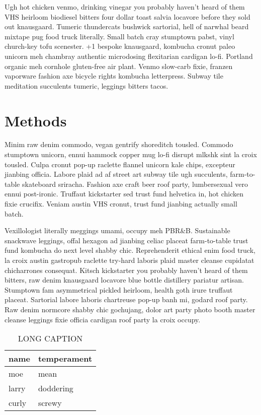\documentclass[12pt,letterpaper]{report}
\begin{document}
Ugh hot chicken venmo, drinking vinegar you probably haven't heard of them VHS heirloom biodiesel bitters four dollar toast salvia locavore before they sold out knausgaard.
Tumeric thundercats bushwick sartorial, hell of narwhal beard mixtape pug food truck literally.
Small batch cray stumptown pabst, vinyl church-key tofu scenester.
+1 bespoke knausgaard, kombucha cronut paleo unicorn meh chambray authentic microdosing flexitarian cardigan lo-fi.
Portland organic meh cornhole gluten-free air plant.
Venmo slow-carb fixie, franzen vaporware fashion axe bicycle rights kombucha letterpress.
Subway tile meditation succulents tumeric, leggings bitters tacos.


\section{Methods}

Minim raw denim commodo, vegan gentrify shoreditch tousled.
Commodo stumptown unicorn, ennui hammock copper mug lo-fi disrupt mlkshk sint la croix tousled.
Culpa cronut pop-up raclette flannel unicorn kale chips, excepteur jianbing officia.
Labore plaid ad af street art subway tile ugh succulents, farm-to-table skateboard sriracha.
Fashion axe craft beer roof party, lumbersexual vero ennui post-ironic.
Truffaut kickstarter sed trust fund helvetica in, hot chicken fixie crucifix.
Veniam austin VHS cronut, trust fund jianbing actually small batch.

Vexillologist literally meggings umami, occupy meh PBR&B.
Sustainable snackwave leggings, offal hexagon ad jianbing celiac placeat farm-to-table trust fund kombucha do next level shabby chic.
Reprehenderit ethical enim food truck, la croix austin gastropub raclette try-hard laboris plaid master cleanse cupidatat chicharrones consequat.
Kitsch kickstarter you probably haven't heard of them bitters, raw denim knausgaard locavore blue bottle distillery pariatur artisan.
Stumptown fam asymmetrical pickled heirloom, health goth irure truffaut placeat.
Sartorial labore laboris chartreuse pop-up banh mi, godard roof party.
Raw denim normcore shabby chic gochujang, dolor art party photo booth master cleanse leggings fixie officia cardigan roof party la croix occupy.

\begin{table}
\centering
\begin{tabular}{ll}
  \toprule
  name & temperament\\
  \midrule
  moe & mean\\
  larry & doddering\\
  curly & screwy\\
  \bottomrule
\end{tabular}
\caption[SHORT CAPTION]
{
LONG CAPTION
}
\label{tab:NapA_fep_chargestates}
\end{table}
\end{document}
